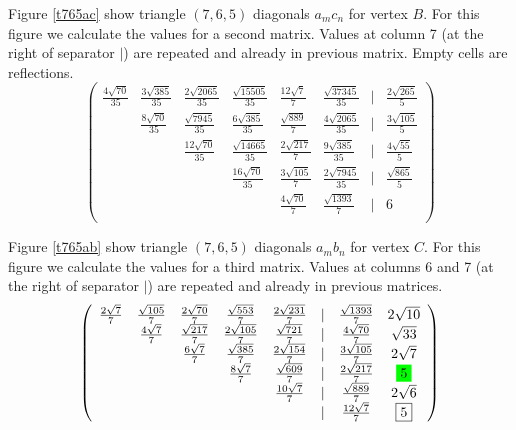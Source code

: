 \documentclass[11pt]{article}
\begin{document}
Figure \ref{t765ac} show triangle $(7,6,5)$ diagonals $a_mc_n$ for vertex $B$. For this figure we calculate
the values for a second matrix. Values at column 7 (at the right of separator $|$) are repeated and already in previous matrix.
Empty cells are reflections.
\begin{equation}\label{eq:appendrow}
\left(\begin{array}{cccccccc}
	\frac{4\sqrt{70}}{35} & \frac{3\sqrt{385}}{35} & \frac{2\sqrt{2065}}{35} & \frac{\sqrt{15505}}{35} & \frac{12\sqrt{7}}{7} & \frac{\sqrt{37345}}{35} & | & \frac{2\sqrt{265}}{5}\\
	& \frac{8\sqrt{70}}{35} & \frac{\sqrt{7945}}{35} & \frac{6\sqrt{385}}{35} & \frac{\sqrt{889}}{7} & \frac{4\sqrt{2065}}{35} & | & \frac{3\sqrt{105}}{5} \\
	& & \frac{12\sqrt{70}}{35} & \frac{\sqrt{14665}}{35} & \frac{2\sqrt{217}}{7} & \frac{9\sqrt{385}}{35} & | & \frac{4\sqrt{55}}{5}\\
	& & & \frac{16\sqrt{70}}{35} & \frac{3\sqrt{105}}{7} & \frac{2\sqrt{7945}}{35} & | & \frac{\sqrt{865}}{5}\\
	& & & & \frac{4\sqrt{70}}{7} & \frac{\sqrt{1393}}{7} & | & \boxed{6}\\
\end{array}\right)
\end{equation}

Figure \ref{t765ab} show triangle $(7,6,5)$ diagonals $a_mb_n$ for vertex $C$. For this figure we calculate
the values for a third matrix. Values at columns 6 and 7 (at the right of separator $|$) 
are repeated and already in previous matrices.
\begin{equation}\label{eq:appendrow}
\left(\begin{array}{cccccccc}
	\frac{2\sqrt7}7 & \frac{\sqrt{105}}7 & \frac{2\sqrt{70}}7 & \frac{\sqrt{553}}7 & \frac{2\sqrt{231}}7 & | &  \frac{\sqrt{1393}}7 & 2\sqrt{10} \\
	 & \frac{4\sqrt7}7 & \frac{\sqrt{217}}7 & \frac{2\sqrt{105}}7 & \frac{\sqrt{721}}7 & | &  \frac{4\sqrt{70}}7 & \sqrt{33} \\
	 & & \frac{6\sqrt7}7 & \frac{\sqrt{385}}7 & \frac{2\sqrt{154}}7 & | &  \frac{3\sqrt{105}}7 & 2\sqrt{7} \\
	 & & & \frac{8\sqrt7}7 & \frac{\sqrt{609}}7 & | &  \frac{2\sqrt{217}}7 & \five \\
	 & & & & \frac{10\sqrt7}7 & | &  \frac{\sqrt{889}}7 & 2\sqrt{6} \\
	 & & & & & | & \frac{12\sqrt7}7 & \boxed{5} \\
\end{array}\right)
\end{equation}
\end{document}
